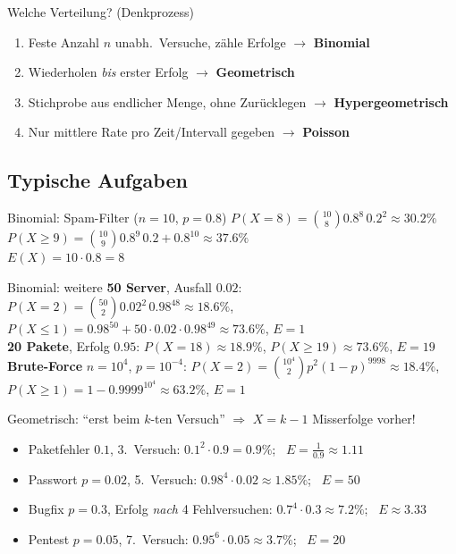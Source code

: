 \documentclass[a4paper, fontsize=7pt]{scrartcl}
\begin{document}
\begin{subbox}{Welche Verteilung? (Denkprozess)}
\begin{enumerate}
    \item Feste Anzahl $n$ unabh.\ Versuche, zähle Erfolge
          $\to$ \textbf{Binomial}
    \item Wiederholen \emph{bis} erster Erfolg $\to$ \textbf{Geometrisch}
    \item Stichprobe aus endlicher Menge, ohne Zurücklegen
          $\to$ \textbf{Hypergeometrisch}
    \item Nur mittlere Rate pro Zeit/Intervall gegeben
          $\to$ \textbf{Poisson}
\end{enumerate}
\end{subbox}

\subsection{Typische Aufgaben}

\begin{subbox}{Binomial: Spam-Filter ($n = 10$, $p = 0.8$)}
$P(X = 8) = \binom{10}{8} 0.8^8\, 0.2^2 \approx 30.2\%$\\
$P(X \ge 9) = \binom{10}{9} 0.8^9\, 0.2 + 0.8^{10} \approx 37.6\%$\\
$E(X) = 10 \cdot 0.8 = 8$
\end{subbox}

\begin{subbox}{Binomial: weitere}
\textbf{50 Server}, Ausfall $0.02$:
$P(X{=}2) = \binom{50}{2} 0.02^2\, 0.98^{48} \approx 18.6\%$,\\
$P(X \le 1) = 0.98^{50} + 50 \cdot 0.02 \cdot 0.98^{49} \approx 73.6\%$,
$E = 1$\\
\textbf{20 Pakete}, Erfolg $0.95$: $P(X{=}18) \approx 18.9\%$,
$P(X \ge 19) \approx 73.6\%$, $E = 19$\\
\textbf{Brute-Force} $n = 10^4$, $p = 10^{-4}$:
$P(X{=}2) = \binom{10^4}{2} p^2 (1-p)^{9998} \approx 18.4\%$,\\
$P(X \ge 1) = 1 - 0.9999^{10^4} \approx 63.2\%$, $E = 1$
\end{subbox}

\begin{subbox}{Geometrisch: ``erst beim $k$-ten Versuch''}
$\Rightarrow$ $X = k - 1$ Misserfolge vorher!
\begin{itemize}
    \item Paketfehler $0.1$, 3.\ Versuch:
          $0.1^2 \cdot 0.9 = 0.9\%$; \ $E = \frac{1}{0.9} \approx 1.11$
    \item Passwort $p = 0.02$, 5.\ Versuch:
          $0.98^4 \cdot 0.02 \approx 1.85\%$; \ $E = 50$
    \item Bugfix $p = 0.3$, Erfolg \emph{nach} 4 Fehlversuchen:
          $0.7^4 \cdot 0.3 \approx 7.2\%$; \ $E \approx 3.33$
    \item Pentest $p = 0.05$, 7.\ Versuch:
          $0.95^6 \cdot 0.05 \approx 3.7\%$; \ $E = 20$
\end{itemize}
\end{subbox}
\end{document}
